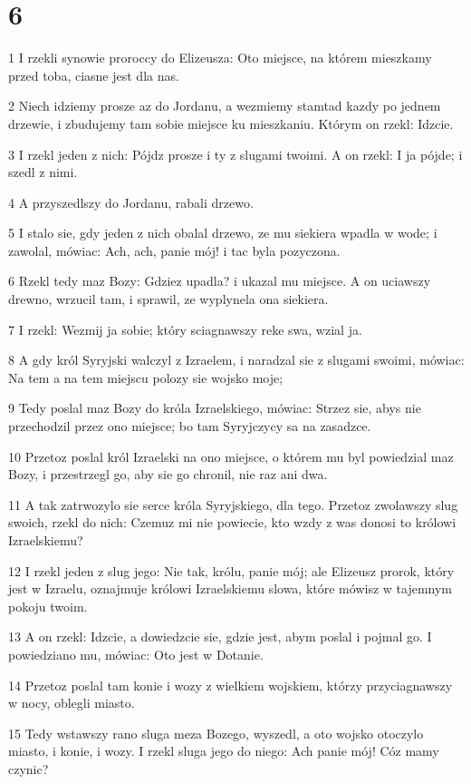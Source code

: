 \chapter{6}

\par 1 I rzekli synowie proroccy do Elizeusza: Oto miejsce, na którem mieszkamy przed toba, ciasne jest dla nas.
\par 2 Niech idziemy prosze az do Jordanu, a wezmiemy stamtad kazdy po jednem drzewie, i zbudujemy tam sobie miejsce ku mieszkaniu. Którym on rzekl: Idzcie.
\par 3 I rzekl jeden z nich: Pójdz prosze i ty z slugami twoimi. A on rzekl: I ja pójde; i szedl z nimi.
\par 4 A przyszedlszy do Jordanu, rabali drzewo.
\par 5 I stalo sie, gdy jeden z nich obalal drzewo, ze mu siekiera wpadla w wode; i zawolal, mówiac: Ach, ach, panie mój! i tac byla pozyczona.
\par 6 Rzekl tedy maz Bozy: Gdziez upadla? i ukazal mu miejsce. A on uciawszy drewno, wrzucil tam, i sprawil, ze wyplynela ona siekiera.
\par 7 I rzekl: Wezmij ja sobie; który sciagnawszy reke swa, wzial ja.
\par 8 A gdy król Syryjski walczyl z Izraelem, i naradzal sie z slugami swoimi, mówiac: Na tem a na tem miejscu polozy sie wojsko moje;
\par 9 Tedy poslal maz Bozy do króla Izraelskiego, mówiac: Strzez sie, abys nie przechodzil przez ono miejsce; bo tam Syryjczycy sa na zasadzce.
\par 10 Przetoz poslal król Izraelski na ono miejsce, o którem mu byl powiedzial maz Bozy, i przestrzegl go, aby sie go chronil, nie raz ani dwa.
\par 11 A tak zatrwozylo sie serce króla Syryjskiego, dla tego. Przetoz zwolawszy slug swoich, rzekl do nich: Czemuz mi nie powiecie, kto wzdy z was donosi to królowi Izraelskiemu?
\par 12 I rzekl jeden z slug jego: Nie tak, królu, panie mój; ale Elizeusz prorok, który jest w Izraelu, oznajmuje królowi Izraelskiemu slowa, które mówisz w tajemnym pokoju twoim.
\par 13 A on rzekl: Idzcie, a dowiedzcie sie, gdzie jest, abym poslal i pojmal go. I powiedziano mu, mówiac: Oto jest w Dotanie.
\par 14 Przetoz poslal tam konie i wozy z wielkiem wojskiem, którzy przyciagnawszy w nocy, oblegli miasto.
\par 15 Tedy wstawszy rano sluga meza Bozego, wyszedl, a oto wojsko otoczylo miasto, i konie, i wozy. I rzekl sluga jego do niego: Ach panie mój! Cóz mamy czynic?
